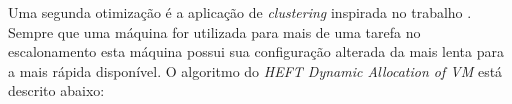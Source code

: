 Uma segunda otimização é a aplicação de \emph{clustering} inspirada no trabalho
\cite{chen:workflowsim}. Sempre que uma máquina for utilizada para mais de uma
tarefa no escalonamento esta máquina possui sua configuração alterada da mais
lenta para a mais rápida disponível. O algoritmo do \emph{HEFT Dynamic Allocation
of VM} está descrito abaixo:


